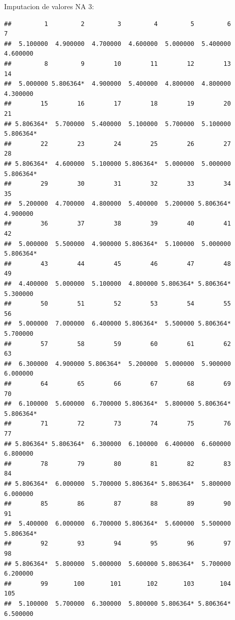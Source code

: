 \documentclass[ignorenonframetext,]{beamer}
\newenvironment{Shaded}{\begin{snugshade}}{\end{snugshade}}
\newcommand{\KeywordTok}[1]{\textcolor[rgb]{0.13,0.29,0.53}{\textbf{#1}}}
\newcommand{\CommentTok}[1]{\textcolor[rgb]{0.56,0.35,0.01}{\textit{#1}}}
\newcommand{\OperatorTok}[1]{\textcolor[rgb]{0.81,0.36,0.00}{\textbf{#1}}}
\newcommand{\NormalTok}[1]{#1}
\begin{document}
\begin{frame}[fragile]{Imputacion de valores NA 3:}
\begin{Shaded}
\end{Shaded}

\begin{verbatim}
##         1         2         3         4         5         6         7 
##  5.100000  4.900000  4.700000  4.600000  5.000000  5.400000  4.600000 
##         8         9        10        11        12        13        14 
##  5.000000 5.806364*  4.900000  5.400000  4.800000  4.800000  4.300000 
##        15        16        17        18        19        20        21 
## 5.806364*  5.700000  5.400000  5.100000  5.700000  5.100000 5.806364* 
##        22        23        24        25        26        27        28 
## 5.806364*  4.600000  5.100000 5.806364*  5.000000  5.000000 5.806364* 
##        29        30        31        32        33        34        35 
##  5.200000  4.700000  4.800000  5.400000  5.200000 5.806364*  4.900000 
##        36        37        38        39        40        41        42 
##  5.000000  5.500000  4.900000 5.806364*  5.100000  5.000000 5.806364* 
##        43        44        45        46        47        48        49 
##  4.400000  5.000000  5.100000  4.800000 5.806364* 5.806364*  5.300000 
##        50        51        52        53        54        55        56 
##  5.000000  7.000000  6.400000 5.806364*  5.500000 5.806364*  5.700000 
##        57        58        59        60        61        62        63 
##  6.300000  4.900000 5.806364*  5.200000  5.000000  5.900000  6.000000 
##        64        65        66        67        68        69        70 
##  6.100000  5.600000  6.700000 5.806364*  5.800000 5.806364* 5.806364* 
##        71        72        73        74        75        76        77 
## 5.806364* 5.806364*  6.300000  6.100000  6.400000  6.600000  6.800000 
##        78        79        80        81        82        83        84 
## 5.806364*  6.000000  5.700000 5.806364* 5.806364*  5.800000  6.000000 
##        85        86        87        88        89        90        91 
##  5.400000  6.000000  6.700000 5.806364*  5.600000  5.500000 5.806364* 
##        92        93        94        95        96        97        98 
## 5.806364*  5.800000  5.000000  5.600000 5.806364*  5.700000  6.200000 
##        99       100       101       102       103       104       105 
##  5.100000  5.700000  6.300000  5.800000 5.806364* 5.806364*  6.500000 

\end{verbatim}
\end{frame}
\end{document}
